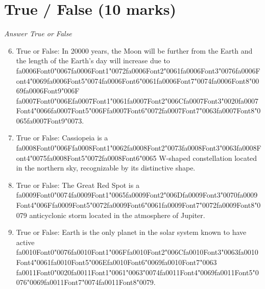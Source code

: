 \documentclass[12pt]{article}
\begin{document}
\section*{True / False (10 marks)}
\textit{Answer True or False}
\begin{enumerate}[label=\arabic*.]
\setcounter{enumi}{5}
\item True or False: In 20000 years, the Moon will be further from the Earth and the length of the Earth's day will increase due to {\csname fa0006Font0\endcsname\char"0067}{\csname fa0006Font1\endcsname\char"0072}{\csname fa0006Font2\endcsname\char"0061}{\csname fa0006Font3\endcsname\char"0076}{\csname fa0006Font4\endcsname\char"0069}{\csname fa0006Font5\endcsname\char"0074}{\csname fa0006Font6\endcsname\char"0061}{\csname fa0006Font7\endcsname\char"0074}{\csname fa0006Font8\endcsname\char"0069}{\csname fa0006Font9\endcsname\char"006F} {\csname fa0007Font0\endcsname\char"006E}{\csname fa0007Font1\endcsname\char"0061}{\csname fa0007Font2\endcsname\char"006C}{\csname fa0007Font3\endcsname\char"0020}{\csname fa0007Font4\endcsname\char"0066}{\csname fa0007Font5\endcsname\char"006F}{\csname fa0007Font6\endcsname\char"0072}{\csname fa0007Font7\endcsname\char"0063}{\csname fa0007Font8\endcsname\char"0065}{\csname fa0007Font9\endcsname\char"0073}.
\item True or False: Cassiopeia is a {\csname fa0008Font0\endcsname\char"006F}{\csname fa0008Font1\endcsname\char"0062}{\csname fa0008Font2\endcsname\char"0073}{\csname fa0008Font3\endcsname\char"0063}{\csname fa0008Font4\endcsname\char"0075}{\csname fa0008Font5\endcsname\char"0072}{\csname fa0008Font6\endcsname\char"0065} W-shaped constellation located in the northern sky, recognizable by its distinctive shape.
\item True or False: The Great Red Spot is a {\csname fa0009Font0\endcsname\char"0074}{\csname fa0009Font1\endcsname\char"0065}{\csname fa0009Font2\endcsname\char"006D}{\csname fa0009Font3\endcsname\char"0070}{\csname fa0009Font4\endcsname\char"006F}{\csname fa0009Font5\endcsname\char"0072}{\csname fa0009Font6\endcsname\char"0061}{\csname fa0009Font7\endcsname\char"0072}{\csname fa0009Font8\endcsname\char"0079} anticyclonic storm located in the atmosphere of Jupiter.
\item True or False: Earth is the only planet in the solar system known to have active {\csname fa0010Font0\endcsname\char"0076}{\csname fa0010Font1\endcsname\char"006F}{\csname fa0010Font2\endcsname\char"006C}{\csname fa0010Font3\endcsname\char"0063}{\csname fa0010Font4\endcsname\char"0061}{\csname fa0010Font5\endcsname\char"006E}{\csname fa0010Font6\endcsname\char"0069}{\csname fa0010Font7\endcsname\char"0063} {\csname fa0011Font0\endcsname\char"0020}{\csname fa0011Font1\endcsname\char"0061}{\char"0063}{\char"0074}{\csname fa0011Font4\endcsname\char"0069}{\csname fa0011Font5\endcsname\char"0076}{\char"0069}{\csname fa0011Font7\endcsname\char"0074}{\csname fa0011Font8\endcsname\char"0079}.

\end{enumerate}
\end{document}
